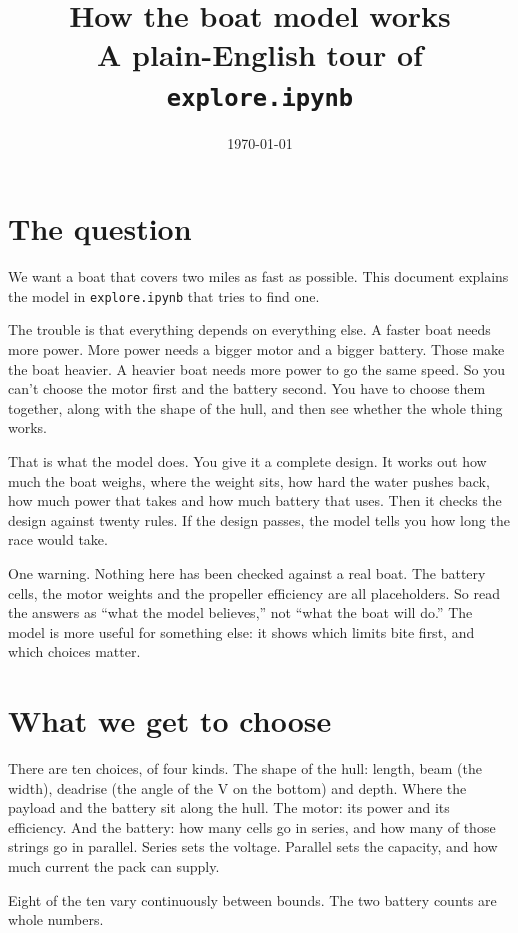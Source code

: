 \documentclass[11pt,a4paper]{article}
\title{How the boat model works\\[0.4em]
\large A plain-English tour of \texttt{explore.ipynb}}
\author{}
\date{\today}
\renewcommand{\_}{\textunderscore\allowbreak}
\newcommand{\code}[1]{\texttt{#1}}
\begin{document}
\maketitle
\thispagestyle{fancy}

\section*{The question}

We want a boat that covers two miles as fast as possible. This document explains the model in \code{explore.ipynb} that tries to find one.

The trouble is that everything depends on everything else. A faster boat needs more power. More power needs a bigger motor and a bigger battery.
Those make the boat heavier. A heavier boat needs more power to go the same speed. So you can't choose the motor first and the battery second.
You have to choose them together, along with the shape of the hull, and then see whether the whole thing works.

That is what the model does. You give it a complete design. It works out how much the boat weighs, where the weight sits, how hard the water pushes back,
how much power that takes and how much battery that uses. Then it checks the design against twenty rules. If the design passes, the model tells you how long the race would take.

One warning. Nothing here has been checked against a real boat. The battery cells, the motor weights and the propeller efficiency are all placeholders.
So read the answers as ``what the model believes,'' not ``what the boat will do.'' The model is more useful for something else: it shows which limits bite first,
and which choices matter.

\section*{What we get to choose}

There are ten choices, of four kinds. The shape of the hull: length, beam (the width), deadrise (the angle of the V on the bottom) and depth.
Where the payload and the battery sit along the hull. The motor: its power and its efficiency. And the battery: how many cells go in series, and how many of
those strings go in parallel. Series sets the voltage. Parallel sets the capacity, and how much current the pack can supply.

Eight of the ten vary continuously between bounds. The two battery counts are whole numbers.
\end{document}
